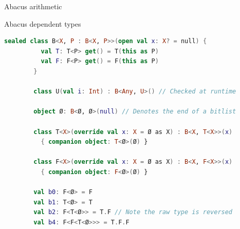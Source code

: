 \documentclass{beamer}
\begin{document}
\begin{frame}{Abacus arithmetic}
    \end{frame}

    \begin{frame}[fragile]{Abacus dependent types}
        \begin{lstlisting}[language=Kotlin, gobble=7]
        sealed class B<X, P : B<X, P>>(open val x: X? = null) {
          val T: T<P> get() = T(this as P)
          val F: F<P> get() = F(this as P)
        }

        class U(val i: Int) : B<Any, U>() // Checked at runtime

        object Ø: B<Ø, Ø>(null) // Denotes the end of a bitlist

        class T<X>(override val x: X = Ø as X) : B<X, T<X>>(x)
          { companion object: T<Ø>(Ø) }

        class F<X>(override val x: X = Ø as X) : B<X, F<X>>(x)
          { companion object: F<Ø>(Ø) }

        val b0: F<Ø> = F
        val b1: T<Ø> = T
        val b2: F<T<Ø>> = T.F // Note the raw type is reversed
        val b4: F<F<T<Ø>>> = T.F.F
        \end{lstlisting}
    \end{frame}
\end{document}
